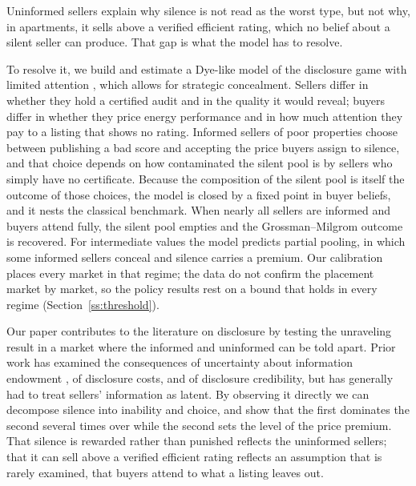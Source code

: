 Uninformed sellers explain why silence is not read as the worst type, but not why, in apartments,
it sells above a verified efficient rating, which no belief about a silent seller can produce.
That gap is what the model has to resolve.

To resolve it, we build and estimate a Dye-like model of the
disclosure game \citep{dye_disclosure_1985} with limited attention
\citep{hirshleifer_limited_2003, gabaix_sparsity_2014}, which allows for strategic
concealment. Sellers differ in whether they
hold a certified audit and in the quality it would reveal; buyers differ in whether they price
energy performance and in how much attention they pay to a listing that shows no rating. Informed sellers of poor properties choose between publishing a bad score
and accepting the price buyers assign to silence, and that choice depends on how contaminated
the silent pool is by sellers who simply have no certificate. Because the composition of the
silent pool is itself the outcome of those choices, the model is closed by a fixed point in
buyer beliefs, and it nests the classical benchmark. When nearly all sellers are informed and buyers attend fully,
the silent pool empties and the Grossman--Milgrom outcome is recovered. For
intermediate values the model predicts partial pooling, in which some informed sellers conceal
and silence carries a premium. Our calibration places every market in that regime; the data do not
confirm the placement market by market, so the policy results rest on a bound that holds in every
regime (Section~\ref{ss:threshold}).

Our paper contributes to the literature on disclosure by testing the unraveling result in a
market where the informed and uninformed can be told apart. Prior work has examined the
consequences of uncertainty about information endowment \citep{dye_disclosure_1985,
jung_kwon_1988}, of disclosure costs, and of disclosure credibility, but has generally had to
treat sellers' information as latent. By observing it directly we can decompose silence into
inability and choice, and show that the first dominates the second several times over
while the second sets the level of the price premium. That silence is rewarded rather
than punished reflects the uninformed sellers; that it can sell above a verified efficient rating
reflects an assumption that is rarely examined, that buyers attend to what a listing leaves out.

